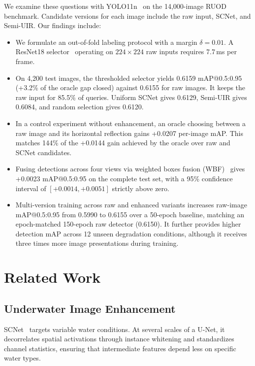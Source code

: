 \documentclass[runningheads]{llncs}
\begin{document}
We examine these questions with YOLO11n~\cite{jocherUltralyticsYOLO2024} on the 14{,}000-image RUOD benchmark. Candidate versions for each image include the raw input, SCNet, and Semi-UIR. Our findings include:
\begin{itemize}
    \item We formulate an out-of-fold labeling protocol with a margin $\delta = 0.01$. A ResNet18 selector~\cite{heDeepResidualLearning2016} operating on $224 \times 224$ raw inputs requires 7.7\,ms per frame.
    \item On 4{,}200 test images, the thresholded selector yields 0.6159 mAP@0.5:0.95 (+3.2\% of the oracle gap closed) against 0.6155 for raw images. It keeps the raw input for 85.5\% of queries. Uniform SCNet gives 0.6129, Semi-UIR gives 0.6084, and random selection gives 0.6120.
    \item In a control experiment without enhancement, an oracle choosing between a raw image and its horizontal reflection gains +0.0207 per-image mAP. This matches 144\% of the +0.0144 gain achieved by the oracle over raw and SCNet candidates.
    \item Fusing detections across four views via weighted boxes fusion (WBF)~\cite{solovyevWeightedBoxesFusion2021} gives +0.0023 mAP@0.5:0.95 on the complete test set, with a 95\% confidence interval of $[+0.0014, +0.0051]$ strictly above zero.
    \item Multi-version training across raw and enhanced variants increases raw-image mAP@0.5:0.95 from 0.5990 to 0.6155 over a 50-epoch baseline, matching an epoch-matched 150-epoch raw detector (0.6150). It further provides higher detection mAP across 12 unseen degradation conditions, although it receives three times more image presentations during training.
\end{itemize}

\section{Related Work}
\label{sec:related}

\subsection{Underwater Image Enhancement}

SCNet~\cite{fuUnderwaterImageEnhancement2022} targets variable water conditions. At several scales of a U-Net, it decorrelates spatial activations through instance whitening and standardizes channel statistics, ensuring that intermediate features depend less on specific water types.
\end{document}
